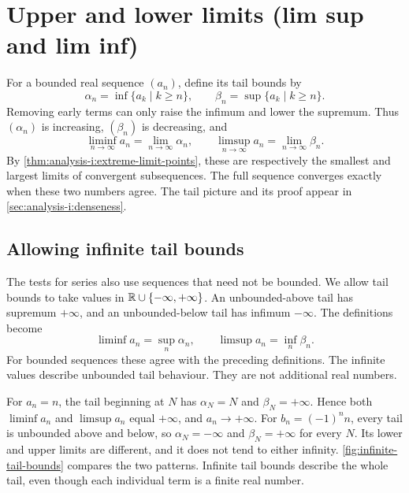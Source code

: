 \section{Upper and lower limits (lim sup and lim inf)}
\label{sec:analysis-i:upper-and-lower-limits}

For a bounded real sequence $(a_n)$, define its tail bounds by
\[
  \alpha_n=\inf\{a_k\mid k\ge n\},\qquad
  \beta_n=\sup\{a_k\mid k\ge n\}.
\]
Removing early terms can only raise the infimum and lower the supremum.
Thus $(\alpha_n)$ is increasing, $(\beta_n)$ is decreasing, and
\[
  \liminf_{n\to\infty}a_n=\lim_{n\to\infty}\alpha_n,
  \qquad
  \limsup_{n\to\infty}a_n=\lim_{n\to\infty}\beta_n.
\]
By \autoref{thm:analysis-i:extreme-limit-points}, these are respectively
the smallest and largest limits of convergent subsequences. The full
sequence converges exactly when these two numbers agree. The tail
picture and its proof appear in \autoref{sec:analysis-i:denseness}.

\subsection{Allowing infinite tail bounds}

The tests for series also use sequences that need not be bounded.
We allow tail bounds to take values in $\mathbb{R}\cup\{-\infty,+\infty\}$.
An unbounded-above tail has supremum $+\infty$, and an
unbounded-below tail has infimum $-\infty$. The definitions become
\[
  \liminf a_n=\sup_n\alpha_n,\qquad
  \limsup a_n=\inf_n\beta_n.
\]
For bounded sequences these agree with the preceding definitions.
The infinite values describe unbounded tail behaviour.
They are not additional real numbers.

\begin{marginfigure}
  \centering
  
  \caption[Two patterns of infinite tail bounds.]{For $a_n=n$, every sufficiently late term stays above a
    chosen level $r$. Here $r=5/2$ and $N=3$.
    For $b_n=(-1)^n n$, every tail reaches arbitrarily far in both
    directions. Dots are actual terms. Ellipses indicate continuation.}
  \label{fig:infinite-tail-bounds}
\end{marginfigure}

\begin{example}
  \label{ex:analysis-i:infinite-tail-bounds}
  For $a_n=n$, the tail beginning at $N$ has $\alpha_N=N$ and
  $\beta_N=+\infty$. Hence both $\liminf a_n$ and $\limsup a_n$
  equal $+\infty$, and $a_n\to+\infty$.
  For $b_n=(-1)^n n$, every tail is unbounded above and below, so
  $\alpha_N=-\infty$ and $\beta_N=+\infty$ for every $N$.
  Its lower and upper limits are different, and it does not tend to
  either infinity. \autoref{fig:infinite-tail-bounds} compares the two
  patterns. Infinite tail bounds describe the whole tail, even though
  each individual term is a finite real number.
\end{example}

